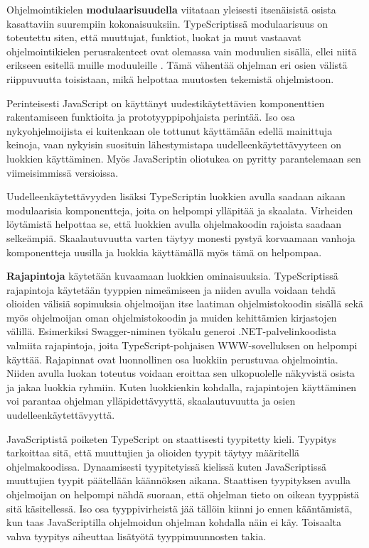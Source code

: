 \documentclass[utf8]{gradu3}
\begin{document}
Ohjelmointikielen \textbf{modulaarisuudella} viitataan yleisesti itsenäisistä osista kasattaviin suurempiin kokonaisuuksiin. TypeScriptissä modulaarisuus on toteutettu siten, että muuttujat, funktiot, luokat ja muut vastaavat ohjelmointikielen perusrakenteet ovat olemassa vain moduulien sisällä, ellei niitä erikseen esitellä muille moduuleille \parencite[]{typescript-modules}. Tämä vähentää ohjelman eri osien välistä riippuvuutta toisistaan, mikä helpottaa muutosten tekemistä ohjelmistoon.

Perinteisesti JavaScript on käyttänyt uudestikäytettävien komponenttien rakentamiseen funktioita ja prototyyppipohjaista perintää. Iso osa nykyohjelmoijista ei kuitenkaan ole tottunut käyttämään edellä mainittuja keinoja, vaan nykyisin suosituin lähestymistapa uudelleenkäytettävyyteen on luokkien käyttäminen. Myös JavaScriptin oliotukea on pyritty parantelemaan sen viimeisimmissä versioissa. \parencite[]{typescript-classes}

Uudelleenkäytettävyyden lisäksi TypeScriptin luokkien avulla saadaan aikaan modulaarisia komponentteja, joita on helpompi ylläpitää ja skaalata. Virheiden löytämistä helpottaa se, että luokkien avulla ohjelmakoodin rajoista saadaan selkeämpiä. Skaalautuvuutta varten täytyy monesti pystyä korvaamaan vanhoja komponentteja uusilla ja luokkia käyttämällä myös tämä on helpompaa.

\textbf{Rajapintoja} käytetään kuvaamaan luokkien ominaisuuksia. TypeScriptissä rajapintoja käytetään tyyppien nimeämiseen ja niiden avulla voidaan tehdä olioiden välisiä sopimuksia ohjelmoijan itse laatiman ohjelmistokoodin sisällä sekä myös ohjelmoijan oman ohjelmistokoodin ja muiden kehittämien kirjastojen välillä. \parencite[]{typescript-interfaces} Esimerkiksi Swagger-niminen työkalu generoi .NET-palvelinkoodista valmiita rajapintoja, joita TypeScript\nobreakdash-\hspace{0pt}pohjaisen WWW-sovelluksen on helpompi käyttää. Rajapinnat ovat luonnollinen osa luokkiin perustuvaa ohjelmointia. Niiden avulla luokan toteutus voidaan eroittaa sen ulkopuolelle näkyvistä osista ja jakaa luokkia ryhmiin. Kuten luokkienkin kohdalla, rajapintojen käyttäminen voi parantaa ohjelman ylläpidettävyyttä, skaalautuvuutta ja osien uudelleenkäytettävyyttä.

JavaScriptistä poiketen TypeScript on staattisesti tyypitetty kieli. Tyypitys tarkoittaa sitä, että muuttujien ja olioiden tyypit täytyy määritellä ohjelmakoodissa. Dynaamisesti tyypitetyissä kielissä kuten JavaScriptissä muuttujien tyypit päätellään käännöksen aikana. Staattisen tyypityksen avulla ohjelmoijan on helpompi nähdä suoraan, että ohjelman tieto on oikean tyyppistä sitä käsitellessä. Iso osa tyyppivirheistä jää tällöin kiinni jo ennen kääntämistä, kun taas JavaScriptilla ohjelmoidun ohjelman kohdalla näin ei käy. Toisaalta vahva tyypitys aiheuttaa lisätyötä tyyppimuunnosten takia.
\end{document}
